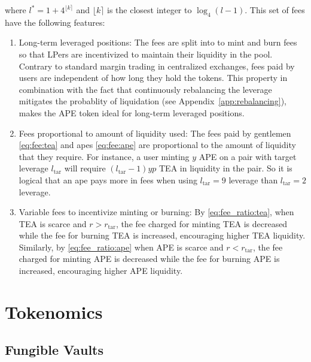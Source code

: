 \documentclass[journal,letterpaper,oneside,onecolumn,12pt]{IEEEtran}
\begin{document}
	where $l^* = 1+4^{\lfloor k \rceil}$ and $\lfloor k \rceil$ is the closest integer to $\log_4(l-1)$.
	This set of fees have the following features:
	\begin{enumerate}
		\item Long-term leveraged positions: The fees are split into to mint and burn fees so that LPers are incentivized to maintain their liquidity in the pool. Contrary to standard margin trading in centralized exchanges, fees paid by users are independent of how long they hold the tokens. This property in combination with the fact that continuously rebalancing the leverage  mitigates the probablity of liquidation (see Appendix~\ref{app:rebalancing}), makes the APE token ideal for long-term leveraged positions.
		\item Fees proportional to amount of liquidity used: The fees paid by gentlemen \eqref{eq:fee:tea} and apes \eqref{eq:fee:ape} are proportional to the amount of liquidity that they require. For instance, a user minting $y$ APE on a pair with target leverage $l_\textrm{tar}$ will require $(l_\textrm{tar}-1)yp$ TEA in liquidity in the pair. So it is logical that an ape pays more in fees when using $l_\textrm{tar}=9$ leverage than $l_\textrm{tar}=2$ leverage.
		\item Variable fees to incentivize minting or burning: By \eqref{eq:fee_ratio:tea}, when TEA is scarce and $r>r_\textrm{tar}$, the fee charged for minting TEA is decreased while the fee for burning TEA is increased, encouraging higher TEA liquidity. Similarly, by \eqref{eq:fee_ratio:ape} when APE is scarce and $r<r_\textrm{tar}$, the fee charged for minting APE is decreased while the fee for burning APE is increased, encouraging higher APE liquidity.
	\end{enumerate}
	 
	
	

	
	
	
	\section{Tokenomics}
	
	
	
	\subsection{Fungible Vaults}
	
\end{document}
